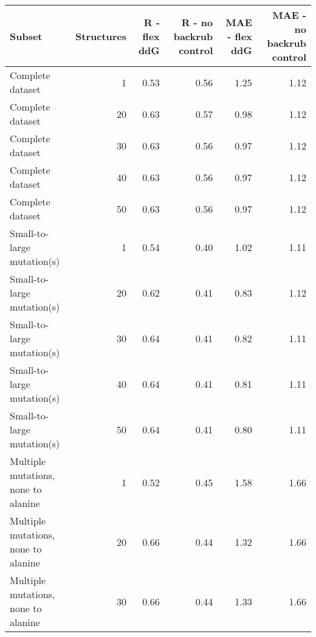 \begin{table}
\begin{tabular}{lrrrrr}
\toprule
                              Subset &  Structures &  R - flex ddG &  R - no backrub control &  MAE - flex ddG &  MAE - no backrub control \\
\midrule
                    Complete dataset &           1 &          0.53 &                    0.56 &            1.25 &                      1.12 \\
                    Complete dataset &          20 &          0.63 &                    0.57 &            0.98 &                      1.12 \\
                    Complete dataset &          30 &          0.63 &                    0.56 &            0.97 &                      1.12 \\
                    Complete dataset &          40 &          0.63 &                    0.56 &            0.97 &                      1.12 \\
                    Complete dataset &          50 &          0.63 &                    0.56 &            0.97 &                      1.12 \\
          Small-to-large mutation(s) &           1 &          0.54 &                    0.40 &            1.02 &                      1.11 \\
          Small-to-large mutation(s) &          20 &          0.62 &                    0.41 &            0.83 &                      1.12 \\
          Small-to-large mutation(s) &          30 &          0.64 &                    0.41 &            0.82 &                      1.11 \\
          Small-to-large mutation(s) &          40 &          0.64 &                    0.41 &            0.81 &                      1.11 \\
          Small-to-large mutation(s) &          50 &          0.64 &                    0.41 &            0.80 &                      1.11 \\
 Multiple mutations, none to alanine &           1 &          0.52 &                    0.45 &            1.58 &                      1.66 \\
 Multiple mutations, none to alanine &          20 &          0.66 &                    0.44 &            1.32 &                      1.66 \\
 Multiple mutations, none to alanine &          30 &          0.66 &                    0.44 &            1.33 &                      1.66 \\

\end{tabular}
\end{table}
